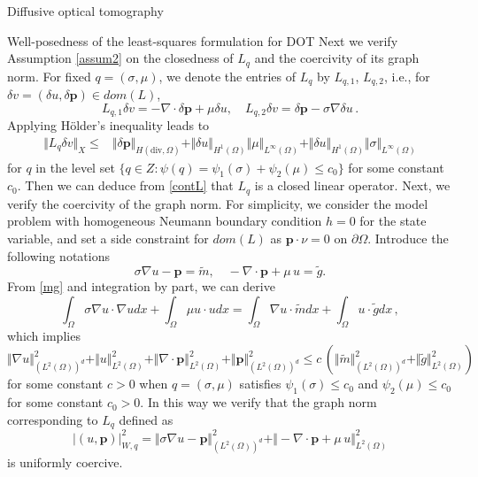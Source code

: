 \documentclass[11pt]{article}%
\renewcommand{\_}{{\fontfamily{ptm}\selectfont\textunderscore}}
\theoremstyle{plain}
\numberwithin{equation}{section}
\newcommand{\m}[1]{\ensuremath{\mathbf{#1}}}
\begin{document}
\begin{section}{Diffusive optical tomography}
\begin{subsection}{Well-posedness of the least-squares formulation for DOT}
Next we verify Assumption \ref{assum2} on the closedness of $L_q$ and the coercivity of its graph norm. 
For fixed $q=(\sigma,\mu)$, we denote the entries of $L_q$ by $L_{q,1}$, $L_{q,2}$, i.e.,  for $\delta v= (\delta u,\delta\m{p})\in dom(L)$, 
$$L_{q,1} \delta v =-\nabla\cdot \delta\m{p}+\mu\delta u,\quad L_{q,2} \delta v = \delta\m{p}-\sigma\nabla\delta  u\,.$$
Applying H\"{o}lder's inequality leads to 
\begin{align}
\Vert L_q\delta v\Vert_{X}\leq& \Vert \delta\m{p}\Vert_{H(\text{div}, \Omega)}+\Vert \delta u\Vert_{H^1(\Omega)}\Vert \mu\Vert_{L^{\infty}(\Omega)}+\Vert \delta u\Vert_{H^1(\Omega)}\Vert \sigma\Vert_{L^{\infty}(\Omega)}  \label{contL}
\end{align}
for $q$ in the level set $\{q\in Z: \psi(q) = \psi_1(\sigma)+\psi_2(\mu)\leq c_0\}$ for some constant $c_0$. Then we can deduce from \eqref{contL} that $L_q$ is a closed linear operator.
Next, we verify the coercivity of the graph norm. For simplicity, we consider the model problem with homogeneous Neumann boundary condition $h = 0$ for the state variable, and set a side constraint for $dom(L)$ as $\m{p}\cdot\nu =0$ on $\partial \Omega$. Introduce the following notations
\begin{equation}
\sigma \nabla u-\m{p}=\tilde{m},\quad -\nabla\cdot \m{p}+\mu\,u=\tilde{g}. \label{mg}
\end{equation}
From \eqref{mg} and integration by part, we can derive
\begin{equation*}
\int_\Omega \sigma \nabla u\cdot\nabla u dx+\int_\Omega\mu u\cdot udx=\int_\Omega\nabla u\cdot \tilde{m}dx+\int_\Omega u\cdot \tilde{g}dx\,,
\end{equation*}
which implies 
\begin{equation}\label{graphsecond}
\Vert \nabla u\Vert_{(L^2(\Omega))^d}^2+\Vert u\Vert_{L^2(\Omega)}^2 +\Vert \nabla \cdot \m{p}\Vert_{L^2(\Omega)}^2+\Vert \m{p}\Vert_{(L^2(\Omega))^d}^2\le c\,(\Vert \tilde{m}\Vert_{(L^2(\Omega))^d}^2+\Vert \tilde{g}\Vert_{L^2(\Omega)}^2)
\end{equation}
for some constant $c>0$ when $q=(\sigma,\mu)$ satisfies $\psi_1(\sigma)\leq c_0$ and $\psi_2(\mu)\leq c_0$ for some constant $c_0>0$. In this way we verify that the graph norm corresponding to $L_q$ defined as 
$$|(u,\m{p}) |^2_{W,q}= \Vert\sigma \nabla u-\m{p}\Vert_{(L^2(\Omega))^d}^2+\Vert -\nabla\cdot \m{p}+\mu\,u\Vert_{L^2(\Omega)}^2$$
 is uniformly coercive.
 

\end{subsection}
\end{section}
\end{document}
